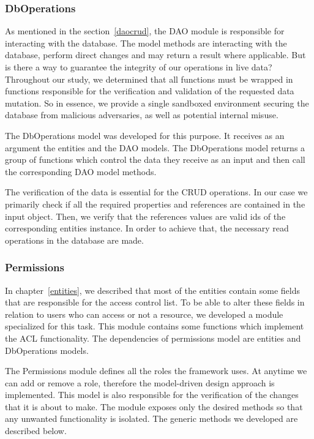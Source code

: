 \subsubsection{DbOperations}
As mentioned in the section~\ref{daocrud}, the DAO module is responsible for interacting with the database. The model methods are interacting with the database, perform direct changes and may return a result where applicable. But is there a way to guarantee the integrity of our operations in live data? Throughout our study, we determined that all functions must be wrapped in functions responsible for the verification and validation of the requested data mutation. So in essence, we provide a single sandboxed environment securing the database from malicious adversaries, as well as potential internal misuse. \par 
	The DbOperations model was developed for this purpose. It receives as an argument the entities and the DAO models. The DbOperations model returns a group of functions which control the data they receive as an input and then call the corresponding DAO model methods. \par 
	The verification of the data is essential for the CRUD operations. In our case we primarily check if all the required properties and references are contained in the input object. Then, we verify that the references values are valid ids of the corresponding entities instance. In order to achieve that, the necessary read operations in the database are made.
	
\subsubsection{Permissions}
In chapter~\ref{entities}, we described that most of the entities contain some fields that are responsible for the access control list. To be able to alter these fields in relation to users who can access or not a resource, we developed a module specialized for this task. This module contains some functions which implement the ACL functionality. The dependencies of permissions model are entities and DbOperations models. \par 
	The Permissions module defines all the roles the framework uses. At anytime we can add or remove a role, therefore the model-driven design approach is implemented. This model is also responsible for the verification of the changes that it is about to make. The module exposes only the desired methods so that any unwanted functionality is isolated. The generic methods we developed are described below. 

